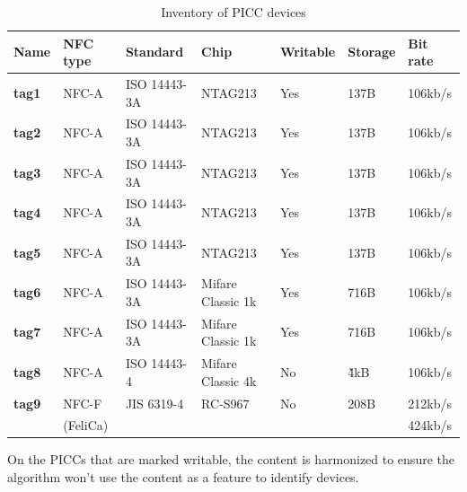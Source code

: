 \begin{table}[h!]
  \centering
  \begin{tabular}{|l|l|l|l|l|l|l|}
    \hline
    \textbf{Name} & \textbf{NFC type} & \textbf{Standard} & \textbf{Chip}     & \textbf{Writable} & \textbf{Storage} & \textbf{Bit rate} \\ \hline
    \textbf{tag1} & NFC-A             & ISO 14443-3A      & NTAG213           & Yes               & 137B             & 106kb/s         \\ \hline
    \textbf{tag2} & NFC-A             & ISO 14443-3A      & NTAG213           & Yes               & 137B             & 106kb/s         \\ \hline
    \textbf{tag3} & NFC-A             & ISO 14443-3A      & NTAG213           & Yes               & 137B             & 106kb/s         \\ \hline
    \textbf{tag4} & NFC-A             & ISO 14443-3A      & NTAG213           & Yes               & 137B             & 106kb/s         \\ \hline
    \textbf{tag5} & NFC-A             & ISO 14443-3A      & NTAG213           & Yes               & 137B             & 106kb/s         \\ \hline \hline
    \textbf{tag6} & NFC-A             & ISO 14443-3A      & Mifare Classic 1k & Yes               & 716B             & 106kb/s         \\ \hline
    \textbf{tag7} & NFC-A             & ISO 14443-3A      & Mifare Classic 1k & Yes               & 716B             & 106kb/s         \\ \hline \hline
    \textbf{tag8} & NFC-A             & ISO 14443-4       & Mifare Classic 4k & No                & \~4kB            & 106kb/s         \\ \hline
    \textbf{tag9} & NFC-F             & JIS 6319-4        & RC-S967           & No                & 208B             & 212kb/s         \\
                  & (FeliCa)          &                   &                   &                   &                  & 424kb/s         \\ \hline
  \end{tabular}
  \caption{Inventory of PICC devices}
  \label{tab:picc-inventory}
\end{table}

On the PICCs that are marked writable, the content is harmonized to ensure the algorithm won't use the content as a feature to identify devices.

